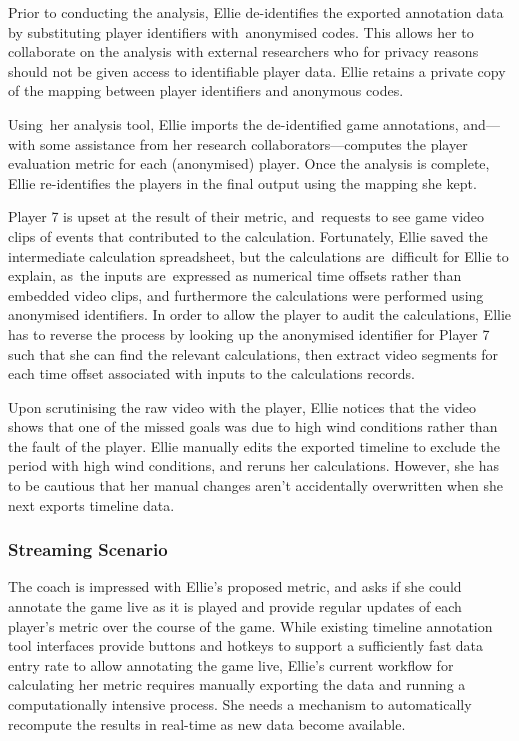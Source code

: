 {}

{Prior to conducting the analysis, Ellie de-identifies the exported
annotation data }{by substituting player identifiers with}{~anonymised
codes. This allows her to collaborate on the analysis with external
researchers who for privacy reasons should not be given access to
identifiable player data. Ellie retains a private copy of the mapping
between player identifiers and anonymous codes.}

{}

{Using}{~her analysis tool, }{Ellie imports the de-identified game
annotations, and---with some assistance from her research collaborators---computes
the player evaluation metric for each (anonymised) player.
Once the analysis is complete, Ellie re-identifies the players in the
final output using the mapping she kept.}

{}

{Player 7 is upset at the result of their metric, and}{~requests to see
game }{video clips of events that contributed to the calculation.
Fortunately, Ellie saved the intermediate calculation spreadsheet, but
the calculations are}{~}{difficult for Ellie to explain, as}{~the
inputs are}{~expressed as numerical time offsets rather than embedded
video clips, and furthermore the calculations were performed using
anonymised identifiers. In order to allow the player to audit the
calculations, Ellie has to reverse the process by looking up the
anonymised identifier for Player 7 such that she can find the relevant
calculations, then extract video segments for each time offset
associated with inputs to the calculations records.}

{}

{Upon scrutinising the raw video with the player, Ellie notices that the
video shows that one of the missed goals was due to high wind conditions
rather than the fault of the player. Ellie manually edits the exported timeline to
exclude the period with high wind conditions, and reruns her calculations.
However, she has to be cautious that her manual changes aren't accidentally overwritten
when she next exports timeline data.}

\subsubsection{Streaming Scenario}

{The coach is impressed with Ellie's proposed metric, and asks if she
could annotate the game live as it is played and provide regular updates
of each player's metric over the course of the game. While existing
timeline annotation tool interfaces provide buttons and hotkeys to
support a sufficiently fast data entry rate to allow annotating the game live,
Ellie's current
workflow for calculating her metric requires manually exporting the data
and running a computationally intensive process. She needs a mechanism
to automatically recompute the results in real-time as new data become
available.}

